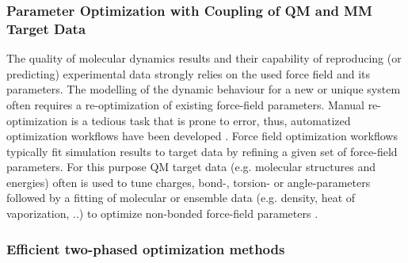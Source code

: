 \documentclass[preprint,12pt]{elsarticle}
\begin{document}
\subsubsection{Parameter Optimization with Coupling of QM and MM Target Data}
The quality of molecular dynamics results and their capability of reproducing (or predicting) experimental data strongly relies on the used force field and its parameters. The modelling of the dynamic behaviour for a new or unique system often requires a re-optimization of existing force-field parameters. Manual re-optimization is a tedious task that is prone to error, thus, automatized optimization workflows have been developed \cite{Aleman1991, Huelsmann2010a, Reith2011, Vlcek2017}. Force field optimization workflows typically fit simulation results to target data by refining a given set of force-field parameters. For this purpose QM target data (e.g. molecular structures and energies) often is used to tune charges, bond-, torsion- or angle-parameters followed by a fitting of molecular or ensemble data (e.g. density, heat of vaporization, ..) to optimize non-bonded force-field parameters \cite{Maxwell1995, Jorgensen1996, Foloppe2000, Siu2012}. 


\subsubsection{Efficient two-phased optimization methods}
\end{document}
